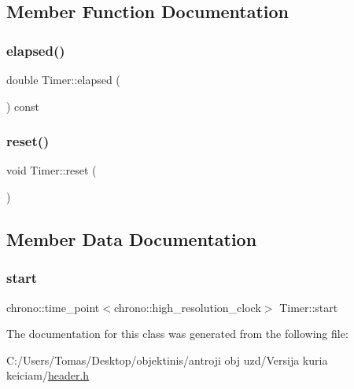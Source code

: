 \subsection{Member Function Documentation}
\mbox{\label{class_timer_a6a89a613c2af9b0d1e5f7e4ba9e46c54}} 
\subsubsection{\texorpdfstring{elapsed()}{elapsed()}}
{\footnotesize\ttfamily double Timer\+::elapsed (\begin{DoxyParamCaption}{ }\end{DoxyParamCaption}) const\hspace{0.3cm}{\ttfamily [inline]}}

\mbox{\label{class_timer_a9020542d73357a4eef512eefaf57524b}} 
\subsubsection{\texorpdfstring{reset()}{reset()}}
{\footnotesize\ttfamily void Timer\+::reset (\begin{DoxyParamCaption}{ }\end{DoxyParamCaption})\hspace{0.3cm}{\ttfamily [inline]}}



\subsection{Member Data Documentation}
\mbox{\label{class_timer_a78c443efac1f9cf716ee8db8b04724c9}} 
\subsubsection{\texorpdfstring{start}{start}}
{\footnotesize\ttfamily chrono\+::time\+\_\+point$<$chrono\+::high\+\_\+resolution\+\_\+clock$>$ Timer\+::start\hspace{0.3cm}{\ttfamily [private]}}



The documentation for this class was generated from the following file\+:\begin{DoxyCompactItemize}
\item 
C\+:/\+Users/\+Tomas/\+Desktop/objektinis/antroji obj uzd/\+Versija kuria keiciam/\mbox{\hyperlink{header_8h}{header.\+h}}\end{DoxyCompactItemize}
